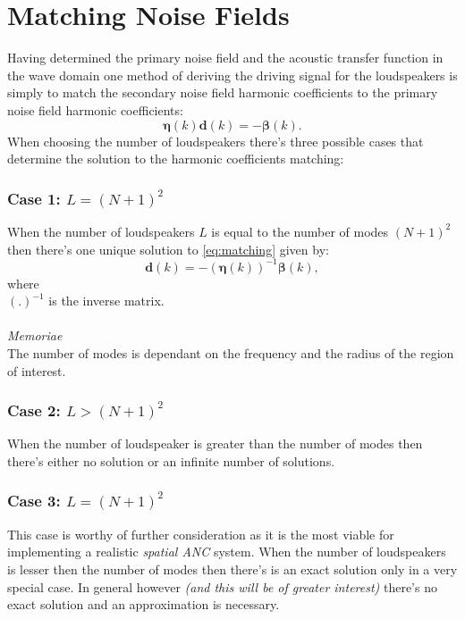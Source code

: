 \section{Matching Noise Fields}
Having determined the primary noise field and the acoustic transfer function in the wave domain one method of deriving the driving signal for the loudspeakers is simply to match the secondary noise field harmonic coefficients to the primary noise field harmonic coefficients\cite{Zhang2019}:
\begin{equation}
    \boldsymbol{\eta}(k)\mathbf{d}(k)=-\boldsymbol{\beta}(k).
    \label{eq:matching}
\end{equation}
When choosing the number of loudspeakers there's three possible cases that determine the solution to the harmonic coefficients matching:

\subsubsection{Case 1: $L = (N + 1)^2$}
When the number of loudspeakers $L$ is equal to the number of modes $(N+1)^2$ then there's one unique solution to \ref{eq:matching} given by\cite{Zhang2019}:
\begin{equation}
    \mathbf{d}(k) = -(\boldsymbol{\eta}(k))^{-1}\boldsymbol{\beta}(k),
\end{equation}
where\\
$(.)^{-1}$ is the inverse matrix.\\\\
\textit{Memoriae}\\
The number of modes is dependant on the frequency and the radius of the region of interest.
\subsubsection{Case 2: $L > (N + 1)^2$}
When the number of loudspeaker is greater than the number of modes then there's either no solution or an infinite number of solutions\cite{Zhang2019}.
\subsubsection{Case 3: $L = (N + 1)^2$}
This case is worthy of further consideration as it is the most viable for implementing a realistic \textit{spatial ANC} system. When the number of loudspeakers is lesser then the number of modes then there's is an exact solution only in a very special case\cite{Zhang2019}. In general however \textit{(and this will be of greater interest)} there's no exact solution and an approximation is necessary.

